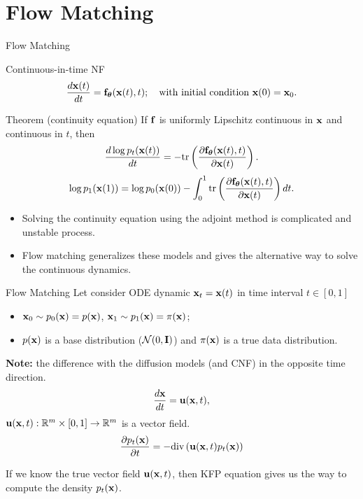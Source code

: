 \section{Flow Matching}
\begin{frame}{Flow Matching}
	\begin{block}{Continuous-in-time NF}
		\vspace{-0.2cm}
		\[
		   \frac{d \mathbf{x}(t)}{dt} = \mathbf{f}_{\boldsymbol{\theta}}(\mathbf{x}(t), t); \quad \text{with initial condition }\mathbf{x}(0) = \mathbf{x}_0. 
		\]
		\vspace{-0.3cm}
	\end{block}	
	\begin{block}{Theorem (continuity equation)}
		If $\mathbf{f}$ is uniformly Lipschitz continuous in $\mathbf{x}$ and continuous in $t$, then
		\[
			\frac{d \log p_t(\mathbf{x}(t))}{d t} = - \text{tr} \left( \frac{\partial \mathbf{f}_{\boldsymbol{\theta}}(\mathbf{x}(t), t)}{\partial \mathbf{x}(t)} \right).
		\]
		\[
			\log p_1(\mathbf{x}(1)) = \log p_0(\mathbf{x}(0)) - \int_{0}^{1} \text{tr}  \left( \frac{\partial \mathbf{f}_{\boldsymbol{\theta}}(\mathbf{x}(t), t)}{\partial \mathbf{x}(t)} \right) dt.
		\]
	\end{block}
	\begin{itemize}
		\item Solving the continuity equation using the adjoint method is complicated and unstable process.
		\item Flow matching generalizes these models and gives the alternative way to solve the continuous dynamics.
	\end{itemize}
\end{frame}
\begin{frame}{Flow Matching}
	Let consider ODE dynamic $\mathbf{x}_t = \mathbf{x}(t)$ in time interval $t \in [0, 1]$
	\begin{itemize}
	\item $\mathbf{x}_0 \sim p_0(\mathbf{x}) = p(\mathbf{x})$, $\mathbf{x}_1 \sim p_1(\mathbf{x}) =  \pi(\mathbf{x})$;
	\item $p(\mathbf{x})$ is a base distribution ($\mathcal{N}(0, \mathbf{I})$) and $\pi(\mathbf{x})$ is a true data distribution.
	\end{itemize} 
	\textbf{Note:} the difference with the diffusion models (and CNF) in the opposite time direction.
	\[
		\frac{d \mathbf{x}}{dt} = \mathbf{u} (\mathbf{x}, t),
	\]
	$\mathbf{u} (\mathbf{x}, t): \mathbb{R}^m \times [0, 1] \rightarrow \mathbb{R}^m$ is a vector field.
	\[
		\frac{\partial p_t(\mathbf{x})}{\partial t} = - \text{div}\left(\mathbf{u}(\mathbf{x}, t) p_t(\mathbf{x})\right) 
	\]
	
	If we know the true vector field $\mathbf{u} (\mathbf{x}, t)$, then KFP equation gives us the way to compute the density $p_t(\mathbf{x})$.
\end{frame}
